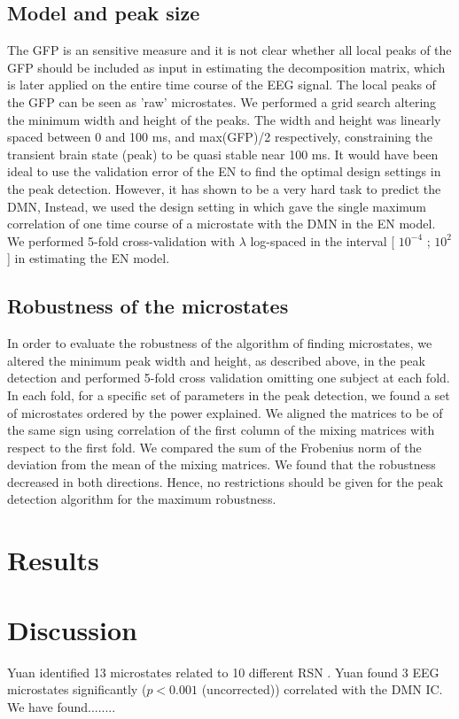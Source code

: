 \documentclass{article}
\begin{document}

\subsection{Model and peak size}
The GFP is an sensitive measure and it is not clear whether all local peaks of the GFP should be included as input in estimating the decomposition matrix, which is later applied on the entire time course of the EEG signal. The local peaks of the GFP can be seen as 'raw' microstates. We performed a grid search altering the minimum width and height of the peaks. The width and height was linearly spaced between 0 and 100 ms, and max(GFP)/2 respectively, constraining the transient brain state (peak) to be quasi stable near 100 ms.
It would have been ideal to use the validation error of the EN to find the optimal design settings in the peak detection. However, it has shown to be a very hard task to predict the DMN, Instead, we used the design setting in which gave the single maximum correlation of one time course of a microstate with the DMN in the EN model.
We performed 5-fold cross-validation with $\lambda$ log-spaced in the interval 
[ $10^{-4}$ ; $10^2$] in estimating the EN model.
\subsection{Robustness of the microstates}
In order to evaluate the robustness of the algorithm of finding microstates, we altered the minimum peak width and height, as described above, in the peak detection and performed 5-fold cross validation omitting one subject at each fold. In each fold, for a specific set of parameters in the peak detection, we found a set of microstates ordered by the power explained. We aligned the matrices to be of the same sign using correlation of the first column of the mixing matrices with respect to the first fold. We compared the sum of the Frobenius norm of the deviation from the mean of the mixing matrices. We found that the robustness decreased in both directions. Hence, no restrictions should be given for the peak detection algorithm for the maximum robustness.
\section{Results}
\section{Discussion}
Yuan identified 13 microstates related to 10 different RSN \cite{Yuan20122062}. Yuan found 3 EEG microstates significantly ($p<0.001$ (uncorrected)) correlated with the DMN IC. We have found........
\end{document}
